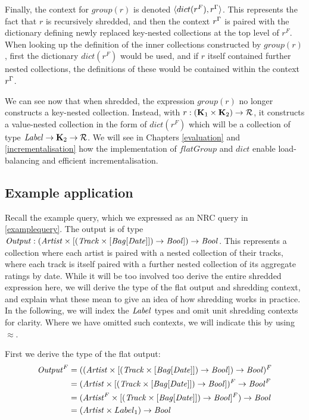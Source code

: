 {{{Finally, the context for $group(r)$ is denoted $\langle dict(r^F), r^\Gamma \rangle$. This represents the fact that $r$ is recursively shredded, and then the context $r^\Gamma$ is paired with the dictionary defining newly replaced key-nested collections at the top level of $r^F$. When looking up the definition of the inner collections constructed by $group(r)$, first the dictionary $dict(r^F)$ would be used, and if $r$ itself contained further nested collections, the definitions of these would be contained within the context $r^\Gamma$.

We can see now that when shredded, the expression $group(r)$ no longer constructs a key-nested collection. Instead, with $r: (\mathbf{K}_1 \times \mathbf{K}_2) \rightarrow \mathcal{R}$, it constructs a value-nested collection in the form of $dict(r^F)$ which will be a collection of type $\textrm{\textit{Label}} \rightarrow \mathbf{K}_2 \rightarrow \mathcal{R}$. We will see in Chapters \ref{evaluation} and \ref{incrementalisation} how the implementation of $flatGroup$ and $dict$ enable load-balancing and efficient incrementalisation.

\subsection{Example application}

Recall the example query, which we expressed as an NRC query in \ref{examplequery}. The output is of type $\textrm{\textit{Output}}: (\textrm{\textit{Artist}} \times [(\textrm{\textit{Track}} \times [\textrm{\textit{Bag}}[\textrm{\textit{Date}}]]) \rightarrow \textrm{\textit{Bool}}]) \rightarrow \textrm{\textit{Bool}}$. This represents a collection where each artist is paired with a nested collection of their tracks, where each track is itself paired with a further nested collection of its aggregate ratings by date. While it will be too involved too derive the entire shredded expression here, we will derive the type of the flat output and shredding context, and explain what these mean to give an idea of how shredding works in practice. In the following, we will index the $\textrm{\textit{Label}}$ types and omit unit shredding contexts for clarity. Where we have omitted such contexts, we will indicate this by using $\approx$.

First we derive the type of the flat output:
\begin{equation*}
\begin{split}
\textrm{\textit{Output}}^F &=((\textrm{\textit{Artist}} \times [(\textrm{\textit{Track}} \times [\textrm{\textit{Bag}}[\textrm{\textit{Date}}]]) \rightarrow \textrm{\textit{Bool}}]) \rightarrow \textrm{\textit{Bool}})^F \\
&= (\textrm{\textit{Artist}} \times [(\textrm{\textit{Track}} \times [\textrm{\textit{Bag}}[\textrm{\textit{Date}}]]) \rightarrow \textrm{\textit{Bool}}])^F \rightarrow \textrm{\textit{Bool}}^F \\
&= (\textrm{\textit{Artist}}^F \times [(\textrm{\textit{Track}} \times [\textrm{\textit{Bag}}[\textrm{\textit{Date}}]]) \rightarrow \textrm{\textit{Bool}}]^F) \rightarrow \textrm{\textit{Bool}} \\
&= (\textrm{\textit{Artist}} \times Label_1) \rightarrow \textrm{\textit{Bool}} \\
\end{split}
\end{equation*}

}}}
